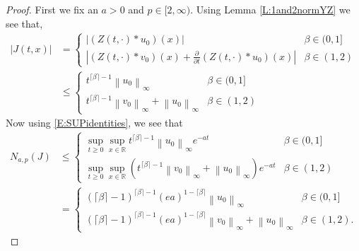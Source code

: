 \documentclass[a4paper,11pt]{article}
\numberwithin{equation}{section}
\theoremstyle{plain}
\theoremstyle{definition}
\newcommand{\Norm}[1]{\left\|  #1   \right\|}
\newcommand{\R}{\mathbb{R}}
\numberwithin{NQ}{section}
\numberwithin{LQ}{section}
\numberwithin{ZQ}{section}
\begin{document}
	\begin{proof}
First we fix an $a>0$ and $p \in [2,\infty)$. Using Lemma \ref{L:1and2normYZ} we see that,
	\begin{align*}
		|J(t,x)|  &= \begin{cases} 
								\left| (Z(t,\cdot) * u_0)(x)  \right| & \beta \in (0,1]
							\\	\left| (Z(t,\cdot) * v_0)(x) + \frac{\partial}{\partial t}(Z(t,\cdot) * u_0)(x) \right| & \beta \in (1,2)
							\end{cases}
		\\& \le \begin{cases}
								t^{\lceil \beta \rceil -1}\Norm{u_0}_\infty & \beta \in (0,1]
							\\ t^{\lceil \beta \rceil -1}\Norm{v_0}_\infty + \Norm{u_0}_\infty & \beta \in (1,2)
					\end{cases} 
	\end{align*}
Now using \eqref{E:SUPidentities}, we see that 
	\begin{align}
	N_{a,p}(J) &\le \begin{cases} 
					\sup_{t\ge 0}\sup_{x\in\R}  t^{\lceil \beta \rceil -1}\Norm{u_0}_\infty e^{-at} & \beta \in (0,1]
					\\ \sup_{t\ge 0}\sup_{x\in\R} \left(  t^{\lceil \beta \rceil -1}\Norm{v_0}_\infty + \Norm{u_0}_\infty \right) e^{-at} & \beta \in (1,2)
								\end{cases} \nonumber
	\\ &= \begin{cases} 
					(\lceil \beta \rceil - 1)^{\lceil \beta \rceil -1}(ea)^{1-\lceil \beta \rceil} \Norm{u_0}_\infty  & \beta \in (0,1]
				\\ (\lceil \beta \rceil - 1)^{\lceil \beta \rceil -1}(ea)^{1-\lceil \beta \rceil} \Norm{v_0}_\infty + \Norm{u_0}_\infty & \beta \in (1,2). 
				\end{cases} \label{E:Jbdd}
	\end{align}


\end{proof}
\end{document}
